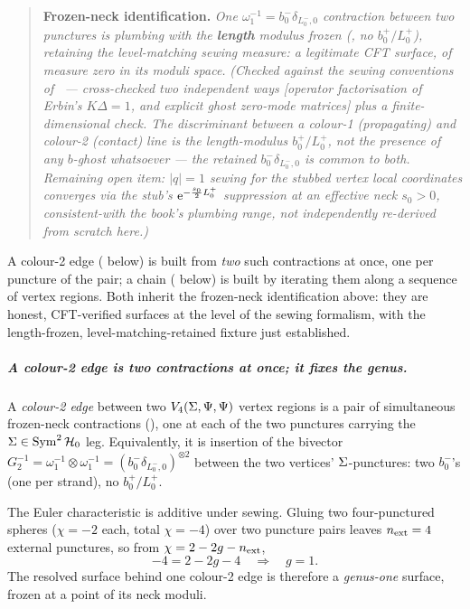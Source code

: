 \begin{quote}
	\textbf{Frozen-neck identification.} \emph{One $\omega_1^{-1}=b_0^-\delta_{L_0^-,0}$ contraction
	between two punctures is plumbing with the \textbf{length} modulus frozen
	(, no $b_0^+/L_0^+$), retaining the level-matching
	sewing measure: a legitimate CFT surface, of measure zero in its moduli
	space.} \emph{(Checked against the sewing conventions of~\cite{Erbin:2021:StringFieldTheory}
	--- cross-checked two independent ways [operator factorisation
	of Erbin's $K\Delta=1$, and explicit ghost zero-mode matrices] plus a
	finite-dimensional check. The discriminant between a colour-1
	(propagating) and colour-2 (contact) line is the \emph{length}-modulus
	$b_0^+/L_0^+$, not the presence of any $b$-ghost whatsoever --- the retained
	$b_0^-\delta_{L_0^-,0}$ is common to both. Remaining open item: $|q|=1$
	sewing for the \emph{stubbed} vertex local coordinates converges via the
	stub's $\mathrm{e}^{-\frac{s_0}2 L_0^+}$ suppression at an effective neck $s_0>0$,
	consistent-with the book's plumbing range, not independently re-derived from
	scratch here.)}
\end{quote}
A colour-2 edge ( below) is built from \emph{two} such
contractions at once, one per puncture of the pair; a chain (
below) is built by iterating them along a sequence of vertex regions. Both
inherit the frozen-neck identification above: they are honest, CFT-verified surfaces at
the level of the sewing formalism, with the length-frozen,
level-matching-retained fixture just established.

\subparagraph{A colour-2 edge is two contractions at once; it fixes the genus.}
\begin{definition}
	\label{rs:def:colour2edge}
	A \emph{colour-2 edge} between two $V_4(\Sigma,\Psi,\Psi)$ vertex regions is a
	pair of simultaneous frozen-neck contractions (), one at
	each of the two punctures carrying the $\Sigma\in\operatorname{Sym}^2\mathcal{H}_0$ leg. Equivalently,
	it is insertion of the bivector
	$G_2^{-1}=\omega_1^{-1}\otimes\omega_1^{-1}
	=(b_0^-\delta_{L_0^-,0})^{\otimes2}$ between the two vertices'
	$\Sigma$-punctures: two $b_0^-$'s (one per strand), no $b_0^+/L_0^+$.
\end{definition}
The Euler characteristic is additive under sewing.
Gluing two four-punctured spheres ($\chi=-2$ each, total $\chi=-4$) over two
puncture pairs leaves $n_{\rm ext}=4$ external punctures, so from
$\chi=2-2g-n_{\rm ext}$,
\begin{equation}
	-4 = 2-2g-4 \quad\Longrightarrow\quad g=1.
	\label{rs:eq:g1}
\end{equation}
The resolved surface behind one colour-2 edge is therefore a \emph{genus-one}
surface, frozen at a point of its neck moduli.


